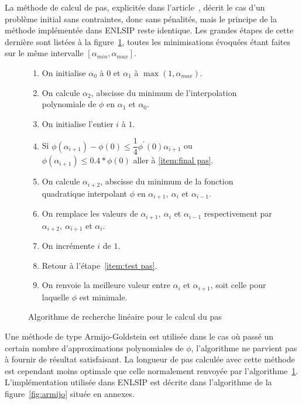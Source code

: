 La méthode de calcul de pas, explicitée dans l'article~\cite{lindstromwedin1984}, décrit le cas d'un problème initial sans contraintes, donc sans pénalités, mais le 
principe de la méthode implémentée dans ENLSIP reste identique. Les grandes étapes de cette dernière sont listées à la figure~\ref{fig:calcul pas}, toutes les minimisations évoquées
étant faites sur le même intervalle $[\alpha_{min},\alpha_{max}]$.

\begin{figure}
\begin{enumerate}
    \item On initialise  $\alpha_0$ à $0$ et $\alpha_1$ à $\max(1,\alpha_{max})$.
    \item On calcule $\alpha_{2}$, abscisse du minimum de l'interpolation polynomiale de $\phi$ en $\alpha_{1}$ et $\alpha_0$.
    \item On initialise l'entier $i$ à $1$.
    \item\label{item:test pas} Si $\phi(\alpha_{i+1})-\phi(0)\leq \dfrac{1}{4}\phi^\prime(0)\alpha_{i+1}$ ou $\phi(\alpha_{i+1}) \leq 0.4*\phi(0)$ aller à \ref{item:final pas}.
    \item On calcule $\alpha_{i+2}$, abscisse du minimum de la fonction quadratique interpolant $\phi$ en $\alpha_{i+1},\ \alpha_{i}$ et $\alpha_{i-1}$.
    \item On remplace les valeurs de $\alpha_{i+1},\ \alpha_{i}$ et $\alpha_{i-1}$ respectivement par $\alpha_{i+2},\ \alpha_{i+1}$ et $\alpha_{i}$.
    \item On incrémente $i$ de $1$.
    \item Retour à l'étape~\ref{item:test pas}.
    \item\label{item:final pas} On renvoie la meilleure valeur entre $\alpha_i$ et $\alpha_{i+1}$, soit celle pour laquelle $\phi$ est minimale.
\end{enumerate}
\caption{Algorithme de recherche linéaire pour le calcul du pas}
\label{fig:calcul pas}
\end{figure}

Une méthode de type Armijo-Goldstein est utilisée dans le cas où passé un certain nombre d'approximations polynomiales de $\phi$, l'algorithme ne parvient pas 
à fournir de résultat satisfaisant. La longueur de pas calculée avec cette méthode est cependant moins optimale que celle normalement renvoyée par l'algorithme~\ref{fig:calcul pas}.
L'implémentation utilisée dans ENLSIP est décrite dans l'algorithme de la figure~\ref{fig:armijo} située en annexes. 

